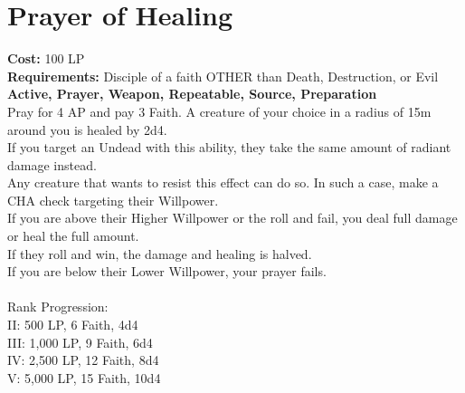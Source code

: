 \section{Prayer of Healing}\label{prayer:healing}
\textbf{Cost:} 100 LP\\
\textbf{Requirements:} Disciple of a faith OTHER than Death, Destruction, or Evil\\
\textbf{Active, Prayer, Weapon, Repeatable, Source, Preparation}\\
Pray for 4 AP and pay 3 Faith.
A creature of your choice in a radius of 15m around you is healed by 2d4.\\
If you target an Undead with this ability, they take the same amount of radiant damage instead.\\
Any creature that wants to resist this effect can do so.
In such a case, make a CHA check targeting their Willpower.\\
If you are above their Higher Willpower or the roll and fail, you deal full damage or heal the full amount.\\
If they roll and win, the damage and healing is halved.\\
If you are below their Lower Willpower, your prayer fails.\\
\\
Rank Progression:\\
II: 500 LP, 6 Faith, 4d4\\
III: 1,000 LP, 9 Faith, 6d4\\
IV: 2,500 LP, 12 Faith, 8d4\\
V: 5,000 LP, 15 Faith, 10d4\\
